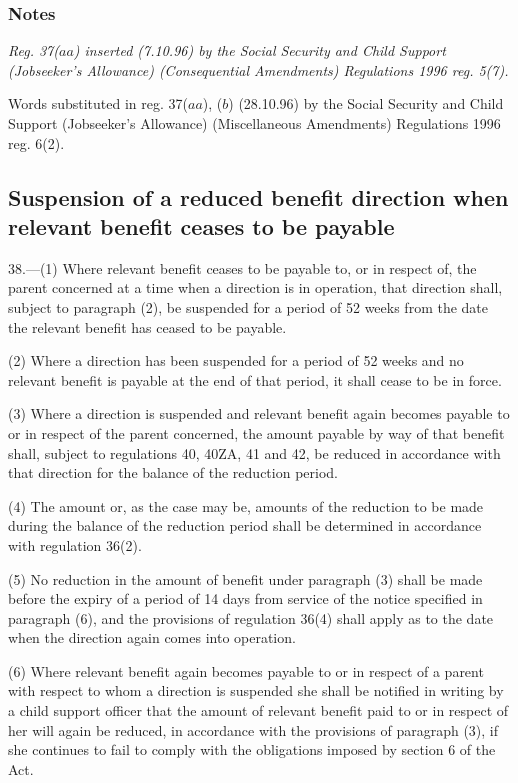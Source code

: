 \documentclass[a4paper]{article}
\newcommand\amendment[1]{\subsubsection*{Notes}{\itshape\frenchspacing\footnotesize #1 \par}}
\begin{document}
\amendment{
Reg. 37($aa$) inserted (7.10.96) by the Social Security and Child Support (Jobseeker's Allowance) (Consequential Amendments) Regulations 1996 reg. 5(7).

Words substituted in reg. 37($aa$), ($b$) (28.10.96) by the Social Security and Child Support (Jobseeker's Allowance) (Miscellaneous Amendments) Regulations 1996 reg. 6(2).
}

\subsection[38. Suspension of a reduced benefit direction when relevant benefit ceases to be payable]{Suspension of a reduced benefit direction when relevant benefit ceases to be payable}

38.—(1) Where relevant benefit ceases to be payable to, or in respect of, the parent concerned at a time when a direction is in operation, that direction shall, subject to paragraph (2), be suspended for a period of 52 weeks from the date the relevant benefit has ceased to be payable.

(2) Where a direction has been suspended for a period of 52 weeks and no relevant benefit is payable at the end of that period, it shall cease to be in force.

(3) Where a direction is suspended and relevant benefit again becomes payable to or in respect of the parent concerned, the amount payable by way of that benefit shall, subject to regulations 40, 
40ZA,  %
41 and 42, be reduced in accordance with that direction for the balance of the reduction period.

(4) The amount or, as the case may be, amounts of the reduction to be made during the balance of the reduction period shall be determined in accordance with regulation 36(2).

(5) No reduction in the amount of benefit under paragraph (3) shall be made before the expiry of a period of 14 days from service of the notice specified in paragraph (6), and the provisions of regulation 36(4) shall apply as to the date when the direction again comes into operation.

(6) Where relevant benefit again becomes payable to or in respect of a parent with respect to whom a direction is suspended she shall be notified in writing by a child support officer that the amount of relevant benefit paid to or in respect of her will again be reduced, in accordance with the provisions of paragraph (3), if she continues to fail to comply with the obligations imposed by section 6 of the Act.
\end{document}
